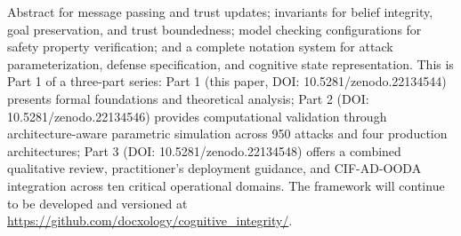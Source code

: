 \documentclass[
  ignorenonframetext,
]{beamer}
\begin{document}
\begin{frame}[allowframebreaks]{Abstract}
for message passing and trust updates; invariants for belief integrity,
goal preservation, and trust boundedness; model checking configurations
for safety property verification; and a complete notation system for
attack parameterization, defense specification, and cognitive state
representation. This is Part 1 of a three-part series: Part 1 (this
paper, DOI: 10.5281/zenodo.22134544) presents formal foundations and
theoretical analysis; Part 2 (DOI: 10.5281/zenodo.22134546) provides
computational validation through architecture-aware parametric
simulation across 950 attacks and four production architectures; Part 3
(DOI: 10.5281/zenodo.22134548) offers a combined qualitative review,
practitioner's deployment guidance, and CIF-AD-OODA integration across
ten critical operational domains. The framework will continue to be
developed and versioned at
\url{https://github.com/docxology/cognitive_integrity/}.
\end{frame}
\end{document}
